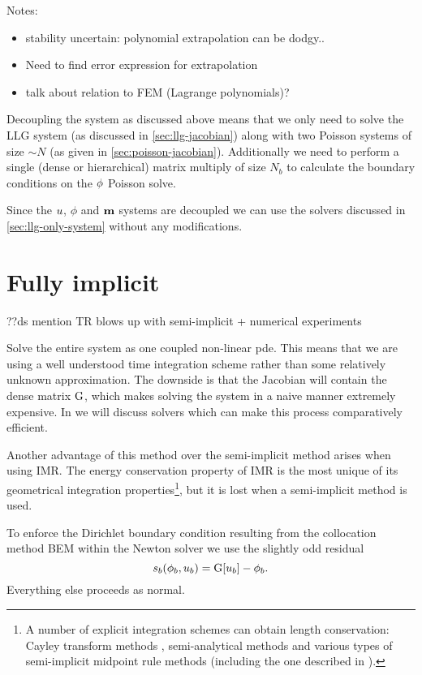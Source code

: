 Notes:
\begin{itemize}
\item stability uncertain: polynomial extrapolation can be dodgy..
\item Need to find error expression for extrapolation
\item talk about relation to FEM (Lagrange polynomials)?
\end{itemize}


Decoupling the system as discussed above means that we only need to solve the LLG system (as discussed in \cref{sec:llg-jacobian}) along with two Poisson systems of size $\sim N$ (as given in \cref{sec:poisson-jacobian}).
Additionally we need to perform a single (dense or hierarchical) matrix multiply of size $N_b$ to calculate the boundary conditions on the $\phi$ Poisson solve.


Since the $u$, $\phi$ and $\mathbf{m}$ systems are decoupled we can use the solvers discussed in \cref{sec:llg-only-system} without any modifications.



\section{Fully implicit}
\label{sec:fully-implicit-bem}

??ds mention TR blows up with semi-implicit + numerical experiments

Solve the entire system as one coupled non-linear pde.
This means that we are using a well understood time integration scheme rather than some relatively unknown approximation.
The downside is that the Jacobian will contain the dense matrix ${\mathbf{\mathrm{G}}}$, which makes solving the system in a naive manner extremely expensive.
In  we will discuss solvers which can make this process comparatively efficient.

Another advantage of this method over the semi-implicit method arises when using IMR.
The energy conservation property of IMR is the most unique of its geometrical integration properties\footnote{A number of explicit integration schemes can obtain length conservation: Cayley transform methods \cite{Lewis2003}, semi-analytical methods \cite{Wiele2010} and various types of semi-implicit midpoint rule methods \cite{Spargo2003} \cite{Mentink2010} (including the one described in ).}, but it is lost when a semi-implicit method is used.

To enforce the Dirichlet boundary condition resulting from the collocation method BEM within the Newton solver we use the slightly odd residual
\newcommand{\rphimb}{\rphi_b}
\begin{equation}
  \rphimb(\phim_b, \phione_b) = \bm[\phione_b] - \phim_b.
\end{equation}
Everything else proceeds as normal.

